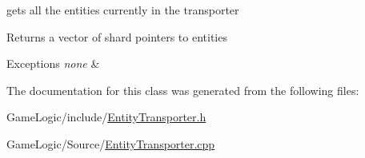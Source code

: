 gets all the entities currently in the transporter \begin{DoxyReturn}{Returns}
a vector of shard pointers to entities 
\end{DoxyReturn}

\begin{DoxyExceptions}{Exceptions}
{\em none} & \\
\hline
\end{DoxyExceptions}


The documentation for this class was generated from the following files\+:\begin{DoxyCompactItemize}
\item 
Game\+Logic/include/\hyperlink{EntityTransporter_8h}{Entity\+Transporter.\+h}\item 
Game\+Logic/\+Source/\hyperlink{EntityTransporter_8cpp}{Entity\+Transporter.\+cpp}\end{DoxyCompactItemize}
